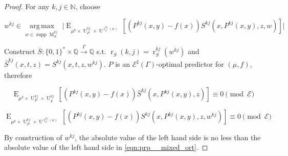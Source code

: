\documentclass{article}
\numberwithin{equation}{section}
\theoremstyle{definition}
\theoremstyle{plain}
\newcommand{\Bool}{\{0,1\}}
\newcommand{\Words}{{\Bool^*}}
\DeclareMathOperator{\Supp}{supp}
\DeclareMathOperator{\E}{E}
\DeclareMathOperator{\R}{r}
\DeclareMathOperator{\M}{M}
\DeclareMathOperator{\U}{U}
\newcommand{\Argmax}[1]{\underset{#1}{\operatorname{arg\,max}}\,}
\newcommand{\Nats}{\mathbb{N}}
\newcommand{\Rats}{\mathbb{Q}}
\newcommand{\Abs}[1]{\lvert #1 \rvert}
\newcommand{\Fall}{\mathcal{E}}
\newcommand{\Scheme}{\xrightarrow{\Gamma}}
\begin{document}
\begin{proof}

For any $k,j \in \Nats$, choose 

$$w^{kj} \in \Argmax{w \in \Supp \M_S^{kj}} \Abs{\E_{\mu^k \times \U_P^{kj} \times \U^{\R_S^{kj}(w)}}[(P^{kj}(x,y) - f(x))S^{kj}(x,P^{kj}(x,y),z,w)]}$$

Construct $\bar{S}: \Words \times \Rats \Scheme \Rats$ s.t. $\R_{\bar{S}}(k,j)=\R_S^{kj}(w^{kj})$ and ${\bar{S}^{kj}(x,t,z)=S^{kj}(x,t,z,w^{kj})}$. $P$ is an $\Fall^\sharp(\Gamma)$-optimal predictor for $(\mu,f)$, therefore

$$\E_{\mu^k \times \U_P^{kj} \times \U_{\bar{S}}^{kj}}[(P^{kj}(x,y) - f(x))\bar{S}^{kj}(x,P^{kj}(x,y),z)] \equiv 0 \pmod \Fall$$

$$\E_{\mu^k \times \U_P^{kj} \times \U^{\R_S^{kj}(w)}}[(P^{kj}(x,y) - f(x))S^{kj}(x,P^{kj}(x,y),z,w^{kj})] \equiv 0 \pmod \Fall$$

By construction of $w^{kj}$, the absolute value of the left hand side is no less than the absolute value of the left hand side in \ref{eqn:prp__mixed_ort}.

\end{proof}
\end{document}
